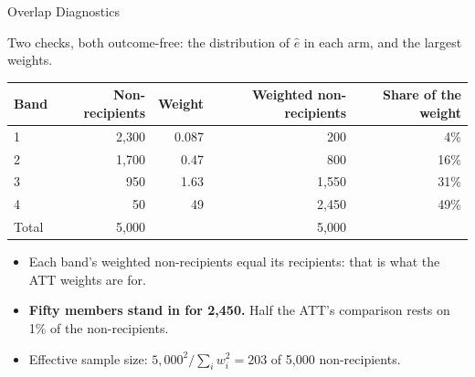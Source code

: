 \documentclass[aspectratio=169, 11pt, handout]{beamer}
\begin{document}
\begin{frame}{Overlap Diagnostics}

Two checks, both outcome-free: the distribution of $\hat e$ in each arm, and the largest weights.

\begin{center}
\small
\begin{tabular}{lrrrr}
\toprule
\textbf{Band} & \textbf{Non-recipients} & \textbf{Weight} & \textbf{Weighted non-recipients} & \textbf{Share of the weight} \\
\midrule
1 & 2{,}300 & 0.087 & 200 & 4\% \\
2 & 1{,}700 & 0.47 & 800 & 16\% \\
3 & 950 & 1.63 & 1{,}550 & 31\% \\
4 & 50 & 49 & 2{,}450 & 49\% \\
\midrule
Total & 5{,}000 & & 5{,}000 & \\
\bottomrule
\end{tabular}
\end{center}

\medskip

\begin{itemize}
  \item Each band's weighted non-recipients equal its recipients: that is what the ATT weights are for.
  \item \textbf{Fifty members stand in for 2{,}450.} Half the ATT's comparison rests on 1\% of the non-recipients.
  \item Effective sample size: $5{,}000^2 / \sum_i w_i^2 = 203$ of 5{,}000 non-recipients.
\end{itemize}
\end{frame}
\end{document}
